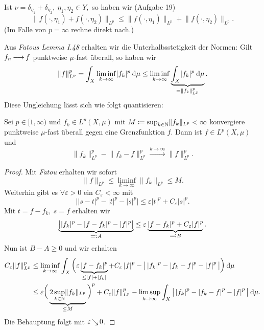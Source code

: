 \documentclass[skript.tex]{subfiles}
\begin{document}
Ist $\nu = \delta_{\eta_1} + \delta_{\eta_2},\ \eta_1, \eta_2 \in Y,$ so haben wir (Aufgabe 19)
\[
	\lVert f(\cdot, \eta_1) + f(\cdot, \eta_2) \rVert_{L^p} \leq \lVert f(\cdot, \eta_1) \rVert_{L^p} + \lVert f(\cdot, \eta_2) \rVert_{L^p}.
\]
(Im Falle von $p=\infty$ rechne direkt nach.)

Aus \textit{Fatous Lemma I.48} erhalten wir die Unterhalbsstetigkeit der Normen: Gilt $f_n \kern -1pt \longrightarrow \kern -1pt f$ punktweise $\mu$-fast überall, so haben wir 
\[
	\lVert f \rVert_{L^p}^p = \int_X \liminf_{k\to \infty} \lvert f_k \rvert^p \: \mathrm{d} \mu \leq \liminf_{k \to \infty} \underbrace{\int_X \lvert f_k \rvert^p \: \mathrm{d} \mu}_{=\lVert f_k \rVert_{L^p}^p}.
\]
Diese Ungleichung lässt sich wie folgt quantisieren:

\begin{lem}
	Sei $p\in[1,\infty)$ und $f_k \in L^p(X,\mu)$ mit $M\coloneqq \sup_{k\in\mathbb{N}} \lVert f_k \rVert_{L^p} < \infty$ konvergiere punktweise $\mu$-fast überall gegen eine Grenzfunktion $f$. Dann ist $f\in L^p(X,\mu)$ und 
	\[
		\lVert f_k \rVert_{L^p}^p - \lVert f_k - f \rVert_{L^p}^p \xrightarrow{k\to\infty} \lVert f \rVert_{L^p}^p.
	\] 
\end{lem}

\begin{proof}
	Mit \textit{Fatou} erhalten wir sofort
	\[
		\lVert f \rVert_{L^p} \leq \liminf_{k\to\infty} \lVert f_k \rVert_{L^p} \leq M.
	\]
	Weiterhin gibt es $\forall \varepsilon>0$ ein $C_\varepsilon< \infty$ mit 
	\[
		\big\lvert \lvert s - t \rvert^p - \lvert t \rvert^p - \lvert s \rvert^p \big\rvert \leq \varepsilon\lvert t \rvert^p + C_\varepsilon\lvert s \rvert^p. 
	\]
	Mit $t=f-f_k,\ s=f$ erhalten wir
	\[
		\underbrace{\big\lvert \lvert f_k \rvert^p - \lvert f-f_k \rvert^p - \lvert f \rvert^p \big\rvert}_{\rotatebox[origin=c]{180}{$\ceq$} A} \leq \varepsilon \underbrace{\lvert f-f_k \rvert^p + C_\varepsilon \lvert f \rvert^p}_{\rotatebox[origin=c]{180}{$\ceq$} B}.
	\]
	Nun ist $B-A \geq 0$ und wir erhalten
	\begin{align*}
		C_\varepsilon \lVert f \rVert_{L^p}^p &\leq \liminf_{k\to\infty} \int_X \bigg( \varepsilon \underbrace{\left| f - f_k \right|^p}_{\leq \left| f \right| + \left| f_k \right|} + C_\varepsilon \left| f \right|^p - \big\lvert \left| f_k \right|^p - \left| f_k - f \right|^p - \left| f \right|^p \big\rvert \bigg) \: \mathrm{d} \mu\\
		&\leq \varepsilon \bigg(\underbrace{2 \sup_{k\in\mathbb{N}} \lVert f_k \rVert_{L^p}}_{\leq M} \bigg)^p + C_\varepsilon \lVert f \rVert_{L^p}^p - \limsup_{k\to\infty} \int_X \big\lvert \left| f_k \right|^p - \left| f_k - f \right|^p - \left| f \right|^p \big\rvert \: \mathrm{d} \mu.
	\end{align*}
	Die Behauptung folgt mit $\varepsilon \kern -2pt \searrow \kern -1pt 0$.
\end{proof}
\end{document}

